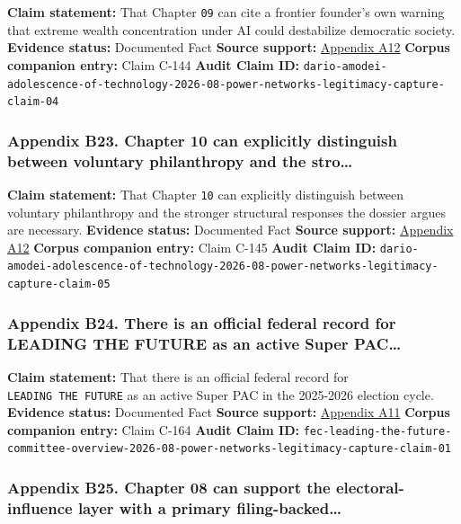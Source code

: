 \documentclass[
  american,
  11pt,
  letterpaper,
]{article}
\begin{document}
\textbf{Claim statement:} That Chapter \texttt{09} can cite a frontier
founder's own warning that extreme wealth concentration under AI could
destabilize democratic society. \textbf{Evidence status:} Documented
Fact \textbf{Source support:}
\hyperref[ch-08-appendix-a12-the-adolescence-of-technology]{Appendix
A12} \textbf{Corpus companion entry:} Claim C-144 \textbf{Audit Claim
ID:}
\texttt{dario-amodei-adolescence-of-technology-2026-08-power-networks-legitimacy-capture-claim-04}

\subsubsection{Appendix B23. Chapter 10 can explicitly distinguish
between voluntary philanthropy and the
stro\ldots{}}\label{ch-08-appendix-b23-chapter-10-can-explicitly-distinguish-between-voluntary-philanthropy-and-the-stro}

\textbf{Claim statement:} That Chapter \texttt{10} can explicitly
distinguish between voluntary philanthropy and the stronger structural
responses the dossier argues are necessary. \textbf{Evidence status:}
Documented Fact \textbf{Source support:}
\hyperref[ch-08-appendix-a12-the-adolescence-of-technology]{Appendix
A12} \textbf{Corpus companion entry:} Claim C-145 \textbf{Audit Claim
ID:}
\texttt{dario-amodei-adolescence-of-technology-2026-08-power-networks-legitimacy-capture-claim-05}

\subsubsection{Appendix B24. There is an official federal record for
LEADING THE FUTURE as an active Super
PAC\ldots{}}\label{ch-08-appendix-b24-there-is-an-official-federal-record-for-leading-the-future-as-an-active-super-pac}

\textbf{Claim statement:} That there is an official federal record for
\texttt{LEADING\ THE\ FUTURE} as an active Super PAC in the 2025-2026
election cycle. \textbf{Evidence status:} Documented Fact \textbf{Source
support:}
\hyperref[ch-08-appendix-a11-leading-the-future-committee-overview]{Appendix
A11} \textbf{Corpus companion entry:} Claim C-164 \textbf{Audit Claim
ID:}
\texttt{fec-leading-the-future-committee-overview-2026-08-power-networks-legitimacy-capture-claim-01}

\subsubsection{Appendix B25. Chapter 08 can support the
electoral-influence layer with a primary
filing-backed\ldots{}}\label{ch-08-appendix-b25-chapter-08-can-support-the-electoral-influence-layer-with-a-primary-filing-backed}
\end{document}
